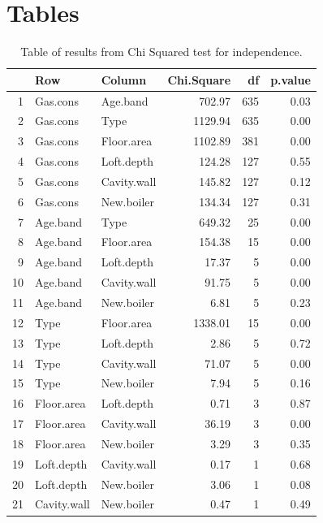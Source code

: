 \documentclass[9pt]{extarticle}
\begin{document}
\section{Tables}

\begin{table}[ht]
	\centering
	\begin{tabular}{rllrrr}
		\hline
		& Row & Column & Chi.Square & df & p.value \\ 
		\hline
		1 & Gas.cons & Age.band & 702.97 & 635 & 0.03 \\ 
		2 & Gas.cons & Type & 1129.94 & 635 & 0.00 \\ 
		3 & Gas.cons & Floor.area & 1102.89 & 381 & 0.00 \\ 
		4 & Gas.cons & Loft.depth & 124.28 & 127 & 0.55 \\ 
		5 & Gas.cons & Cavity.wall & 145.82 & 127 & 0.12 \\ 
		6 & Gas.cons & New.boiler & 134.34 & 127 & 0.31 \\ 
		7 & Age.band & Type & 649.32 &  25 & 0.00 \\ 
		8 & Age.band & Floor.area & 154.38 &  15 & 0.00 \\ 
		9 & Age.band & Loft.depth & 17.37 &   5 & 0.00 \\ 
		10 & Age.band & Cavity.wall & 91.75 &   5 & 0.00 \\ 
		11 & Age.band & New.boiler & 6.81 &   5 & 0.23 \\ 
		12 & Type & Floor.area & 1338.01 &  15 & 0.00 \\ 
		13 & Type & Loft.depth & 2.86 &   5 & 0.72 \\ 
		14 & Type & Cavity.wall & 71.07 &   5 & 0.00 \\ 
		15 & Type & New.boiler & 7.94 &   5 & 0.16 \\ 
		16 & Floor.area & Loft.depth & 0.71 &   3 & 0.87 \\ 
		17 & Floor.area & Cavity.wall & 36.19 &   3 & 0.00 \\ 
		18 & Floor.area & New.boiler & 3.29 &   3 & 0.35 \\ 
		19 & Loft.depth & Cavity.wall & 0.17 &   1 & 0.68 \\ 
		20 & Loft.depth & New.boiler & 3.06 &   1 & 0.08 \\ 
		21 & Cavity.wall & New.boiler & 0.47 &   1 & 0.49 \\ 
		\hline
	\end{tabular}
\caption{Table of results from Chi Squared test for independence.}
\label{tab:chi}
\end{table}
\end{document}

